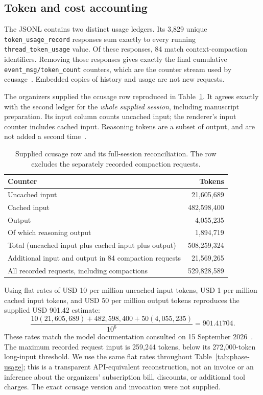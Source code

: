 \subsection{Token and cost accounting}

The JSONL contains two distinct usage ledgers. Its 3,829 unique
\texttt{token\_usage\_record} responses sum exactly to every running
\texttt{thread\_token\_usage} value. Of these responses, 84 match
context-compaction identifiers. Removing those responses gives exactly
the final cumulative \texttt{event\_msg/token\_count} counters, which
are the counter stream used by ccusage~\cite{ccusage-docs}.
Embedded copies of history and usage are not new requests.

The organizers supplied the ccusage row reproduced in
Table~\ref{tab:tokens}. It agrees exactly with the second ledger for
the \emph{whole supplied session}, including manuscript preparation.
Its input column counts uncached input; the renderer's input counter
includes cached input. Reasoning tokens are a subset of output, and
are not added a second time~\cite{promptcaching,reasoning}.

\begin{table}[ht]
\centering
\caption{Supplied ccusage row and its full-session reconciliation.
The row excludes the separately recorded compaction requests.}
\label{tab:tokens}
\begin{tabular}{lr}
\toprule
Counter & Tokens\\
\midrule
Uncached input & 21,605,689\\
Cached input & 482,598,400\\
Output & 4,055,235\\
\quad Of which reasoning output & 1,894,719\\
Total (uncached input plus cached input plus output) & 508,259,324\\
\midrule
Additional input and output in 84 compaction requests & 21,569,265\\
All recorded requests, including compactions & 529,828,589\\
\bottomrule
\end{tabular}
\end{table}

Using flat rates of USD 10 per million uncached input tokens, USD 1
per million cached input tokens, and USD 50 per million output tokens
reproduces the supplied USD 901.42 estimate:
\[
 \frac{10(21{,}605{,}689)+482{,}598{,}400+50(4{,}055{,}235)}{10^6}
 =901.41704.
\]
These rates match the model documentation consulted on 15 September
2026~\cite{astra}. The maximum recorded request input is 259,244
tokens, below its 272,000-token long-input threshold. We use the same
flat rates throughout Table~\ref{tab:phase-usage}; this is a transparent
API-equivalent reconstruction, not an invoice or an inference about
the organizers' subscription bill, discounts, or additional tool charges.
The exact ccusage version and invocation were not supplied.

